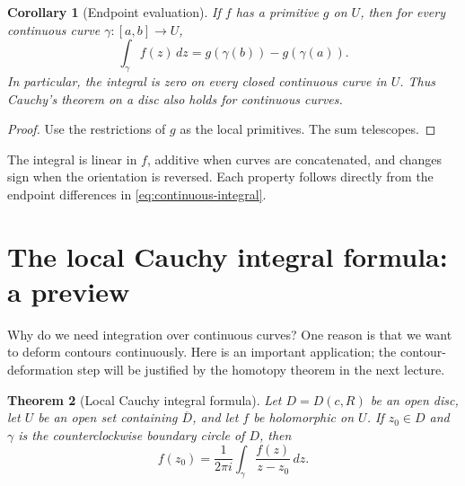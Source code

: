 \documentclass[11pt]{article}
\theoremstyle{plain}
\newtheorem{theorem}{Theorem}[section]
\newtheorem{corollary}[theorem]{Corollary}
\theoremstyle{definition}
\theoremstyle{remark}
\numberwithin{equation}{section}
\begin{document}
\begin{corollary}[Endpoint evaluation]
If $f$ has a primitive $g$ on $U$, then for every continuous curve
$\gamma\colon[a,b]\to U$,
\[
 \int_\gamma f(z)\,dz=g(\gamma(b))-g(\gamma(a)).
\]
In particular, the integral is zero on every closed continuous curve in
$U$. Thus Cauchy's theorem on a disc also holds for continuous curves.
\end{corollary}
\begin{proof}
Use the restrictions of $g$ as the local primitives. The sum telescopes.
\end{proof}
The integral is linear in $f$, additive when curves are concatenated,
and changes sign when the orientation is reversed. Each property follows
directly from the endpoint differences in \eqref{eq:continuous-integral}.

\section{The local Cauchy integral formula: a preview}
Why do we need integration over continuous curves? One reason is that
we want to deform contours continuously. Here is an important application;
the contour-deformation step will be justified by the homotopy theorem
in the next lecture.

\begin{theorem}[Local Cauchy integral formula]\label{thm:cauchy-formula}
Let $D=D(c,R)$ be an open disc, let $U$ be an open set containing
$\overline D$, and let $f$ be holomorphic on $U$.
If $z_0\in D$ and $\gamma$ is the counterclockwise boundary circle
of $D$, then
\begin{equation}\label{eq:cauchy-formula}
 \boxed{\displaystyle
 f(z_0)=\frac{1}{2\pi i}\int_\gamma\frac{f(z)}{z-z_0}\,dz.}
\end{equation}
\end{theorem}
\end{document}
